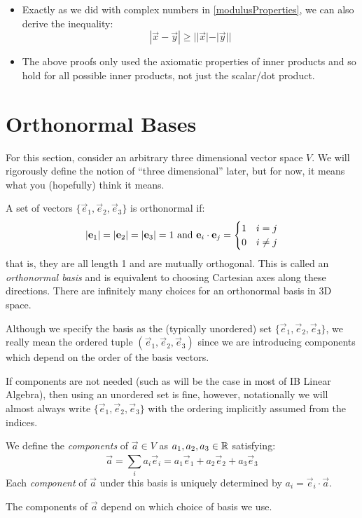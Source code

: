\documentclass[../main.tex]{subfiles}
\begin{document}
\begin{remark}[Remarks]
  \begin{itemize}
    \item Exactly as we did with complex numbers in \cref{modulusProperties}, we can also derive the inequality:
      \[
        |\vec{x} - \vec{y}| \geq ||\vec{x}| - |\vec{y}||
      \]
    \item The above proofs only used the axiomatic properties of inner products and so hold for all possible inner products, not just the scalar/dot product.
  \end{itemize}
\end{remark}
\section{Orthonormal Bases}
\label{orthonormalBasis}
\begin{remark}[Note]
  For this section, consider an arbitrary three dimensional vector space $V$.
  We will rigorously define the notion of ``three dimensional'' later, but for now, it means what you (hopefully) think it means.
\end{remark}
A set of vectors $\{\vec{e}_1, \vec{e}_2, \vec{e}_3\}$ is orthonormal if:
\[
  \left\lvert \mathbf{\bm{e}}_1 \right\rvert = \left\lvert \mathbf{\bm{e}}_2 \right\rvert = \left\lvert \mathbf{\bm{e}}_3 \right\rvert = 1 \text{ and } \mathbf{\bm{e}}_i \cdot \mathbf{\bm{e}}_j = \begin{cases}
  1 & i=j \\
  0 & i\neq j
  \end{cases}
\]
that is, they are all length 1 and are mutually orthogonal.
This is called an \textit{orthonormal basis} and is equivalent to choosing Cartesian axes along these directions.
There are infinitely many choices for an orthonormal basis in 3D space.
\begin{remark}
  Although we specify the basis as the (typically unordered) set $\{\vec{e}_1, \vec{e}_2, \vec{e}_3\}$, we really mean the ordered tuple $(\vec{e}_1, \vec{e}_2, \vec{e}_3)$ since we are introducing components which depend on the order of the basis vectors.

  If components are not needed (such as will be the case in most of IB Linear Algebra), then using an unordered set is fine, however, notationally we will almost always write $\{\vec{e}_1, \vec{e}_2, \vec{e}_3\}$ with the ordering implicitly assumed from the indices.
\end{remark}
We define the \textit{components} of $\vec{a} \in V$ as $a_1, a_2, a_3 \in \mathbb{R}$ satisfying:
\[
  \vec{a} = \sum_{i}^{} a_i \vec{e}_i = a_1 \vec{e}_1 + a_2 \vec{e}_2 + a_3 \vec{e}_3
\]
Each \textit{component} of $\vec{a}$ under this basis is uniquely determined by $a_i = \vec{e}_i \cdot \vec{a}$.
\begin{remark}[Warning]
  The components of $\vec{a}$ depend on which choice of basis we use.
\end{remark}
\end{document}
